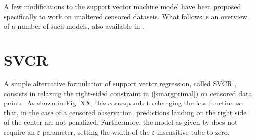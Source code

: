 \documentclass[12pt]{report}
\begin{document}
A few modifications to the support vector machine model have been proposed specifically to work on unaltered censored datasets. What follows is an overview of a number of such models, also available in \cite{vanbelle11}.

\section{SVCR}
A simple alternative formulation of support vector regression, called SVCR \cite{shivaswamy07}, consists in relaxing the right-sided constraint in (\ref{smargprimal}) on censored data points. As shown in Fig. XX, this corresponds to changing the loss function so that, in the case of a censored observation, predictions landing on the right side of the center are not penalized. Furthermore, the model as given by \cite{vanbelle11} does not require an $\varepsilon$ parameter, setting the width of the $\varepsilon$-insensitive tube to zero.
\end{document}
